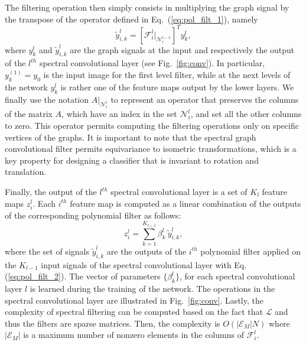 \documentclass[10pt,journal,compsoc]{IEEEtran}
\begin{document}
	The filtering operation then simply consists in multiplying the graph signal by the transpose of the operator defined in Eq.~(\ref{eq:pol_filt_1}), namely
	\begin{equation}
	\tilde{y}_{i,k}^{l} =\left[\mathcal{F}_i^{l}|_{\mathcal{N}_i^{l-1}}\right]^T y_k^{l} ,
	\label{eq:pol_filt_2}
	\end{equation}
	\noindent
	where $y_k^{l}$ and $\tilde{y}_{i,k}^{l}$ are the graph signals at the input and respectively the output of the $l^{th}$ spectral convolutional layer (see Fig.~\ref{fig:conv}). In particular, $y_k^{(1)} = y_0$ is the input image for the first level filter, while at the next levels of the network $y_k^{l}$ is rather one of the feature maps output by the lower layers. We finally use the notation $A |_{\mathcal{N}_i^{l}}$ to represent an operator that preserves the columns of the matrix $A$, which have an index in the set ${\mathcal{N}_i^{l}}$, and set all the other columns to zero. This operator permits computing the filtering operations only on specific vertices of the graphs. It is important to note that the spectral graph convolutional filter permits equivariance to isometric transformations, which is a key property for designing a classifier that is invariant to rotation and translation.




	Finally, the output of the $l^{th}$ spectral convolutional layer is a set of $K_{l}$ feature maps $z_i^{l}$. Each $i^{th}$ feature map is computed as a linear combination of the outputs of the corresponding polynomial filter as follows: %
	\begin{equation}
	z_i^{l} =  \sum_{k=1}^{K_{l-1}} \beta_{k}^{l} \ \tilde{y}_{i,k}^{l} ,
	\label{eq:lincomb}
	\end{equation}
	\noindent
	where the set of signals $\tilde{y}_{i,k}^{l}$ are the outputs of the $i^{th}$ polynomial filter applied on the $K_{l-1}$ input signals of the spectral convolutional layer with Eq. (\ref{eq:pol_filt_2}). The vector of parameters $\{\beta_{k}^{l}\}$, for each spectral convolutional layer $l$ is learned during the training of the network. The operations in the spectral convolutional layer are illustrated in Fig.~\ref{fig:conv}. Lastly, the complexity of spectral filtering can be computed based on the fact that $\mathcal{L}$ and thus the filters are sparse matrices. Then, the complexity is $O(|\mathcal{E}_M | N)$ where $|\mathcal{E}_M|$ is a maximum number of nonzero elements in the columns of $\mathcal{F}_i^{l}$.
\end{document}
